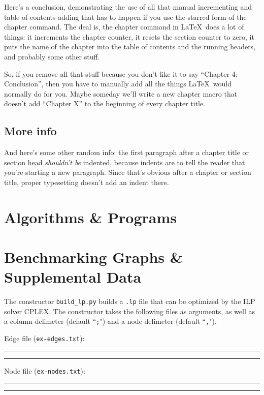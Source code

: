 \documentclass[12pt,twoside]{reedthesis}
\theoremstyle{definition}
\begin{document}
Here's a conclusion, demonstrating the use of all that manual incrementing and table of contents adding that has to happen if you use the starred form of the chapter command. The deal is, the chapter command in \LaTeX\ does a lot of things: it increments the chapter counter, it resets the section counter to zero, it puts the name of the chapter into the table of contents and the running headers, and probably some other stuff.

So, if you remove all that stuff because you don't like it to say ``Chapter 4: Conclusion'', then you have to manually add all the things \LaTeX\ would normally do for you. Maybe someday we'll write a new chapter macro that doesn't add ``Chapter X'' to the beginning of every chapter title.

\section{More info}
And here's some other random info: the first paragraph after a chapter title or section head \emph{shouldn't be} indented, because indents are to tell the reader that you're starting a new paragraph. Since that's obvious after a chapter or section title, proper typesetting doesn't add an indent there.


    \appendix
      \chapter{Algorithms \& Programs}
      \chapter{Benchmarking Graphs \& Supplemental Data}

        The constructor \verb|build_lp.py| builds a \texttt{.lp} file that can be optimized by the ILP solver CPLEX. The constructor takes the following files as arguments, as well as a column delimeter (default ``\texttt{;}") and a node delimeter (default ``\texttt{,}").

        Edge file (\texttt{ex-edges.txt}):\\
        \rule{\textwidth}{1pt}
        
        \rule{\textwidth}{1pt}

        \newpage

        Node file (\texttt{ex-nodes.txt}):\\
        \rule{\textwidth}{1pt}
        
        \rule{\textwidth}{1pt}
\end{document}
